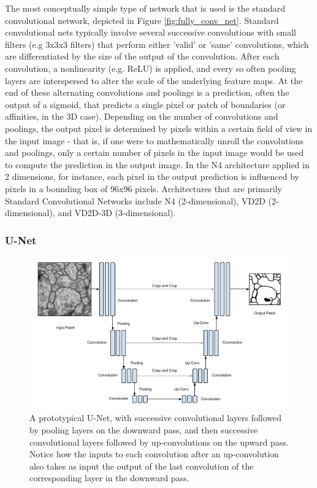 The most conceptually simple type of network that is used is the standard convolutional network, depicted in Figure \ref{fig:fully_conv_net}. Standard convolutional nets typically involve several successive convolutions with small filters (e.g 3x3x3 filters) that perform either 'valid' or 'same' convolutions, which are differentiated by the size of the output of the convolution. After each convolution, a nonlinearity (e.g. ReLU) is applied, and every so often pooling layers are interspersed to alter the scale of the underlying feature maps. At the end of these alternating convolutions and poolings is a prediction, often the output of a sigmoid, that predicts a single pixel or patch of boundaries (or affinities, in the 3D case). Depending on the number of convolutions and poolings, the output pixel is determined by pixels within a certain field of view in the input image - that is, if one were to mathematically unroll the convolutions and poolings, only a certain number of pixels in the input image would be used to compute the prediction in the output image. In the N4 architecture applied in 2 dimensions, for instance, each pixel in the output prediction is influenced by pixels in a bounding box of 96x96 pixels. Architectures that are primarily Standard Convolutional Networks include N4 (2-dimensional), VD2D (2-dimensional), and VD2D-3D (3-dimensional)\cite{Cirean,Lee}.

\subsubsection{U-Net}

\begin{figure}
\centering
\includegraphics[width=\textwidth]{img/U_Net.png}
\caption[A prototypical U-Net]{A prototypical U-Net, with successive convolutional layers followed by pooling layers on the downward pass, and then successive convolutional layers followed by up-convolutions on the upward pass. Notice how the inputs to each convolution after an up-convolution also takes as input the output of the last convolution of the corresponding layer in the downward pass.}
\label{fig:u_net}
\end{figure}

